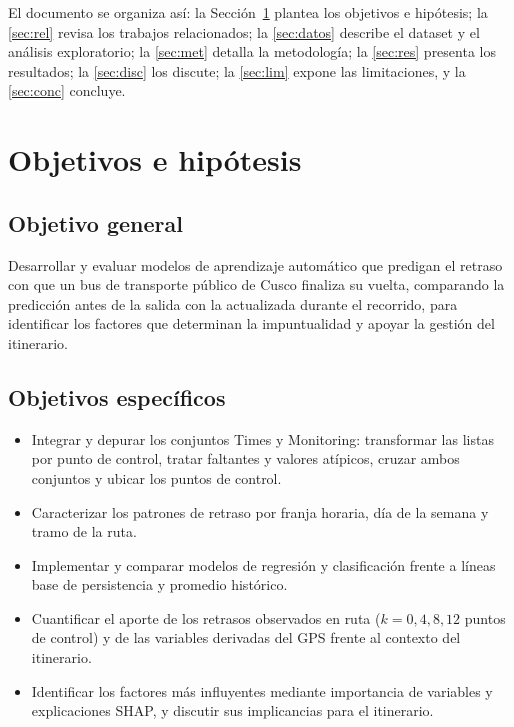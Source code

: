 \documentclass[conference]{IEEEtran}
\begin{document}
El documento se organiza así: la Sección~\ref{sec:obj} plantea los objetivos e hipótesis; la \ref{sec:rel} revisa los trabajos relacionados; la \ref{sec:datos} describe el dataset y el análisis exploratorio; la \ref{sec:met} detalla la metodología; la \ref{sec:res} presenta los resultados; la \ref{sec:disc} los discute; la \ref{sec:lim} expone las limitaciones, y la \ref{sec:conc} concluye.

\section{Objetivos e hipótesis}\label{sec:obj}

\subsection{Objetivo general}
Desarrollar y evaluar modelos de aprendizaje automático que predigan el retraso con que un bus de transporte público de Cusco finaliza su vuelta, comparando la predicción antes de la salida con la actualizada durante el recorrido, para identificar los factores que determinan la impuntualidad y apoyar la gestión del itinerario.

\subsection{Objetivos específicos}
\begin{itemize}
\item[OE1.] Integrar y depurar los conjuntos Times y Monitoring: transformar las listas por punto de control, tratar faltantes y valores atípicos, cruzar ambos conjuntos y ubicar los puntos de control.
\item[OE2.] Caracterizar los patrones de retraso por franja horaria, día de la semana y tramo de la ruta.
\item[OE3.] Implementar y comparar modelos de regresión y clasificación frente a líneas base de persistencia y promedio histórico.
\item[OE4.] Cuantificar el aporte de los retrasos observados en ruta ($k = 0, 4, 8, 12$ puntos de control) y de las variables derivadas del GPS frente al contexto del itinerario.
\item[OE5.] Identificar los factores más influyentes mediante importancia de variables y explicaciones SHAP, y discutir sus implicancias para el itinerario.
\end{itemize}
\end{document}
